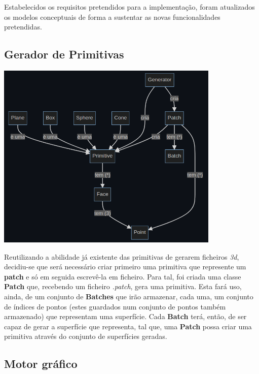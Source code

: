 Estabelecidos os requisitos pretendidos para a
implementação, foram atualizados os modelos conceptuais
de forma a sustentar as novas funcionalidades pretendidas.
\newline

\subsection{Gerador de Primitivas}

\begin{center}
    \includegraphics[width=0.8\textwidth]{imgs/concept1.png}
    \label{fig:domger}
\end{center}

\noindent
Reutilizando a abilidade já existente das primitivas de
gerarem ficheiros \textit{3d}, decidiu-se que será necessário
criar primeiro uma primitiva que represente um \textbf{patch}
e só em seguida escrevê-la em ficheiro.
\newline
\break
\noindent
Para tal, foi criada uma classe \textbf{Patch} que, recebendo
um ficheiro \textit{.patch}, gera uma primitiva. Esta fará uso,
ainda, de um conjunto de \textbf{Batches} que irão armazenar,
cada uma, um conjunto de índices de pontos (estes guardados
num conjunto de pontos também armazenado)
que representam uma superfície.
\newline
\break
\noindent
Cada \textbf{Batch} terá, então, de ser capaz de gerar a
superfície que representa, tal que, uma \textbf{Patch} possa
criar uma primitiva através do conjunto de superfícies
geradas.
\newline

\subsection{Motor gráfico}

